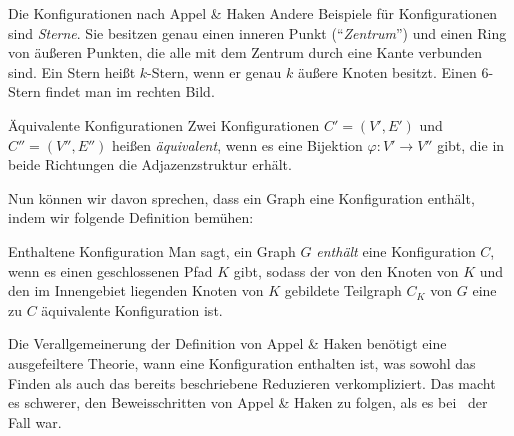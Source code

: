 \begin{section}{Die Konfigurationen nach Appel \& Haken}
  Andere Beispiele für Konfigurationen sind \textit{Sterne}. Sie besitzen genau einen inneren Punkt (``\textit{Zentrum}'') und einen Ring von äußeren Punkten, die alle mit dem Zentrum durch eine Kante verbunden sind. Ein Stern heißt $k$-Stern, wenn er genau $k$ äußere Knoten besitzt. Einen $6$-Stern findet man im rechten Bild.
  
  \begin{definition}{Äquivalente Konfigurationen}
   Zwei Konfigurationen $C'=(V',E')$ und $C''=(V'',E'')$ heißen \textit{äquivalent}, wenn es eine Bijektion $\varphi : V' \rightarrow V''$ gibt, die in beide Richtungen die Adjazenzstruktur erhält.
  \end{definition}
  
  Nun können wir davon sprechen, dass ein Graph eine Konfiguration enthält, indem wir folgende Definition bemühen:
  
  \begin{definition}{Enthaltene Konfiguration}
   Man sagt, ein Graph $G$ \textit{enthält} eine Konfiguration $C$, wenn es einen geschlossenen Pfad $K$ gibt, sodass der von den Knoten von $K$ und den im Innengebiet liegenden Knoten von $K$ gebildete Teilgraph $C_K$ von $G$ eine zu $C$ äquivalente Konfiguration ist.
  \end{definition}

  Die Verallgemeinerung der Definition von Appel \& Haken benötigt eine ausgefeiltere Theorie, wann eine Konfiguration enthalten ist, was sowohl das Finden als auch das bereits beschriebene Reduzieren verkompliziert. Das macht es schwerer, den Beweisschritten von Appel \& Haken zu folgen, als es bei \rsst\-\ der Fall war. 
\end{section}
